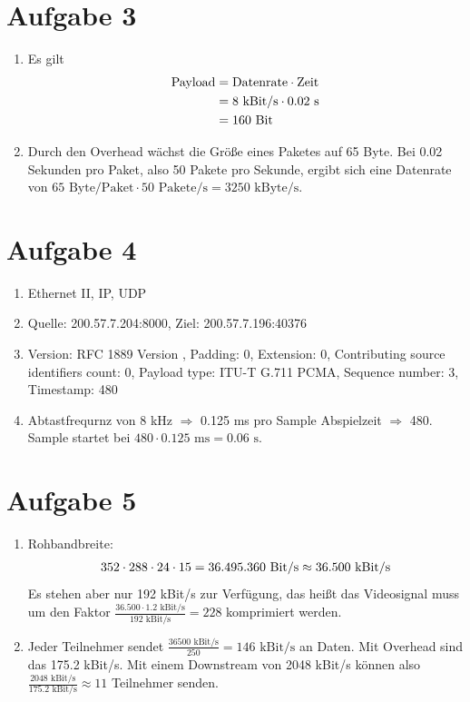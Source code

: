 \documentclass{article}
\begin{document}
	\section*{Aufgabe 3}
	\begin{enumerate}[label=(\alph*)]
		\item Es gilt
		\begin{align}
			\text{Payload} &= \text{Datenrate} \cdot \text{Zeit} \notag \\
			&= 8\text{ kBit/s} \cdot 0.02\text{ s} \notag \\
			&= 160\text{ Bit} \notag
		\end{align}
		\item Durch den Overhead wächst die Größe eines Paketes auf 65 Byte. Bei 0.02 Sekunden pro Paket, also 50 Pakete pro Sekunde, ergibt sich eine Datenrate von $65\text{ Byte/Paket} \cdot 50\text{ Pakete/s} = 3250\text{ kByte/s}$.
	\end{enumerate}

	\section*{Aufgabe 4}
	\begin{enumerate}[label=(\alph*)]
		\item Ethernet II, IP, UDP
		\item Quelle: 200.57.7.204:8000, Ziel: 200.57.7.196:40376
		\item Version: RFC 1889 Version , Padding: 0, Extension: 0, Contributing source identifiers count: 0, Payload type: ITU-T G.711 PCMA, Sequence number: 3, Timestamp: 480
		\item Abtastfrequrnz von 8 kHz $\Rightarrow$ 0.125 ms pro Sample Abspielzeit $\Rightarrow$ 480. Sample startet bei $480\cdot 0.125\text{ ms} = 0.06\text{ s}$.
	\end{enumerate}

	\section*{Aufgabe 5}
	\begin{enumerate}[label=(\alph*)]
		\item Rohbandbreite:
		\begin{align}
			352\cdot 288\cdot 24\cdot 15 = 36.495.360 \text{ Bit/s} \approx 36.500\text{ kBit/s} \notag
		\end{align}
		Es stehen aber nur 192 kBit/s zur Verfügung, das heißt das Videosignal muss um den Faktor $\frac{36.500\cdot 1.2\text{ kBit/s}}{192\text{ kBit/s}}=228$ komprimiert werden.
		\item Jeder Teilnehmer sendet $\frac{36500\text{ kBit/s}}{250}=146\text{ kBit/s}$ an Daten. Mit Overhead sind das 175.2 kBit/s. Mit einem Downstream von 2048 kBit/s können also $\frac{2048\text{ kBit/s}}{175.2\text{ kBit/s}}\approx 11$ Teilnehmer senden.
	\end{enumerate}
	
\end{document}
